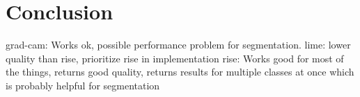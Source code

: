\section{Conclusion}
grad-cam: Works ok, possible performance problem for segmentation.
lime: lower quality than rise, prioritize rise in implementation
rise: Works good for most of the things, returns good quality, returns results for multiple classes at once which is probably helpful for segmentation